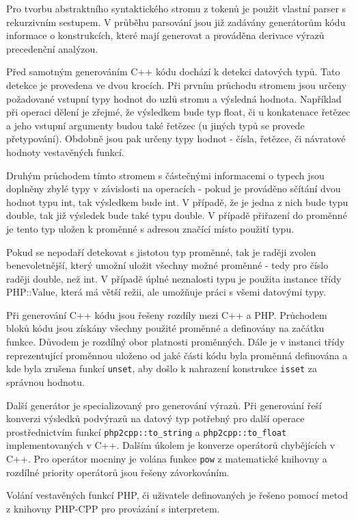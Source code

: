 \documentclass[czech]{ExcelAtFIT}
\newcommand{\function}[1]{\texttt{#1}}
\begin{document}
	Pro tvorbu abstraktního syntaktického stromu z tokenů je použit vlastní parser s rekurzivním sestupem. V průběhu parsování jsou již zadávány generátorům kódu informace o konstrukcích, které mají generovat a prováděna derivace výrazů precedenční analýzou.

	Před samotným generováním C++ kódu dochází k detekci datových typů. Tato detekce je provedena ve dvou krocích. Při prvním průchodu stromem jsou určeny požadované vstupní typy hodnot do uzlů stromu a výsledná hodnota. Například při operaci dělení je zřejmé, že výsledkem bude typ float, či u konkatenace řetězec a jeho vstupní argumenty budou také řetězec (u jiných typů se provede přetypování). Obdobně jsou pak určeny typy hodnot - čísla, řetězce, či návratové hodnoty vestavěných funkcí.

	Druhým průchodem tímto stromem s částečnými informacemi o typech jsou doplněny zbylé typy v závislosti na operacích - pokud je prováděno sčítání dvou hodnot typu int, tak výsledkem bude int. V případě, že je jedna z nich bude typu double, tak již výsledek bude také typu double. V případě přiřazení do proměnné je tento typ uložen k proměnné s adresou značící místo použití typu.

	Pokud se nepodaří detekovat s jistotou typ proměnné, tak je raději zvolen benevoletnější, který umožní uložit všechny možné proměnné - tedy pro číslo raději double, než int. V případě úplné neznalosti typu je použita instance třídy PHP::Value, která má větší režii, ale umožňuje práci s všemi datovými typy.

	Při generování C++ kódu jsou řešeny rozdíly mezi C++ a PHP. Průchodem bloků kódu jsou získány všechny použité proměnné a definovány na začátku funkce. Důvodem je rozdílný obor platnosti proměnných. Dále je v instanci třídy reprezentující proměnnou uloženo od jaké části kódu byla proměnná definována a kde byla zrušena funkcí \function{unset}, aby došlo k nahrazení konstrukce \function{isset} za správnou hodnotu.

	Další generátor je specializovaný pro generování výrazů. Při generování řeší konverzi výsledků podvýrazů na datový typ potřebný pro další operace prostřednictvím funkcí \function{php2cpp::to\_string} a \function{php2cpp::to\_float} implementovaných v C++. Dalším úkolem je konverze operátorů chybějících v C++. Pro operátor mocniny je volána funkce \function{pow} z matematické knihovny a rozdílné priority operátorů jsou řešeny závorkováním.

	Volání vestavěných funkcí PHP, či uživatele definovaných je řešeno pomocí metod z knihovny PHP-CPP pro provázání s interpretem.
\end{document}
